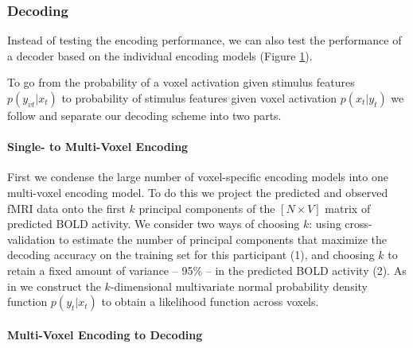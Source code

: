 \begin{figure}
 \label{fig:decoding_scheme}
\end{figure}


\subsubsection*{Decoding}

Instead of testing the encoding performance, we can also test the performance
of a decoder based on the individual encoding models \citep{NG11} (Figure
\ref{fig:decoding_scheme}).

To go from the probability of a voxel activation
given stimulus features $p(y_{vt}|x_{t})$ to probability of stimulus features
given voxel activation $p(x_{t}|y_{t})$ we follow \citet{NG09} and separate our
decoding scheme into two parts. 

\paragraph{Single- to Multi-Voxel Encoding}

First we condense the large number of voxel-specific encoding models into one
multi-voxel encoding model.  To do this we project the predicted and observed
f{MRI} data onto the first $k$ principal components of the $[N\times V]$ matrix
of predicted BOLD activity. We consider two ways of choosing $k$: using
cross-validation to estimate the number of principal components
that maximize the decoding accuracy on the training set for this participant
(1), and choosing $k$ to retain a fixed amount of variance -- 95\% -- in the
predicted BOLD activity (2). As in \citet{NG09} we construct the $k$-dimensional multivariate normal
probability density function $p(y_{t}|x_{t})$ to obtain a likelihood function
across voxels. 

\paragraph{Multi-Voxel Encoding to Decoding}


